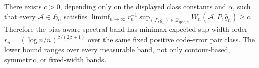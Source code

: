 There exists \(c>0\), depending only on the displayed class constants and \(\alpha\), such that every \(\mathcal A\in\mathfrak H_\alpha\) satisfies \(\liminf_{n\to\infty}r_n^{-1}\sup_{(P,\bar g_n)\in\mathcal Q_{\mathrm{spec},n}}W_n(\mathcal A,P,\bar g_n)\ge c\). Therefore the bias-aware spectral band has minimax expected sup-width order \(r_n=(\log n/n)^{\beta/(2\beta+1)}\) over the same fixed positive code-error pair class. The lower bound ranges over every measurable band, not only contour-based, symmetric, or fixed-width bands.